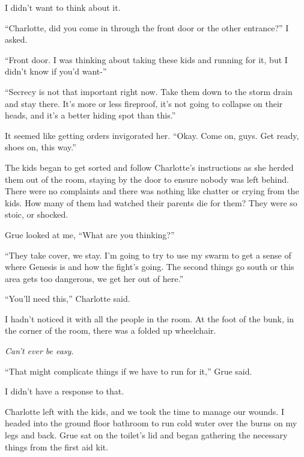 I didn't want to think about it.



``Charlotte, did you come in through the front door or the other entrance?''  I asked.



``Front door.  I was thinking about taking these kids and running for it, but I didn't know if you'd want-''



``Secrecy is not that important right now.  Take them down to the storm drain and stay there.  It's more or less fireproof, it's not going to collapse on their heads, and it's a better hiding spot than this.''



It seemed like getting orders invigorated her.  ``Okay.  Come on, guys.  Get ready, shoes on, this way.''



The kids began to get sorted and follow Charlotte's instructions as she herded them out of the room, staying by the door to ensure nobody was left behind.  There were no complaints and there was nothing like chatter or crying from the kids.  How many of them had watched their parents die for them?  They were so stoic, or shocked.



Grue looked at me, ``What are you thinking?''



``They take cover, we stay.  I'm going to try to use my swarm to get a sense of where Genesis is and how the fight's going.  The second things go south or this area gets too dangerous, we get her out of here.''



``You'll need this,'' Charlotte said.



I hadn't noticed it with all the people in the room.  At the foot of the bunk, in the corner of the room, there was a folded up wheelchair.



\emph{Can't ever be easy}.



``That might complicate things if we have to run for it,'' Grue said.



I didn't have a response to that.



Charlotte left with the kids, and we took the time to manage our wounds.  I headed into the ground floor bathroom to run cold water over the burns on my legs and back.  Grue sat on the toilet's lid and began gathering the necessary things from the first aid kit.



